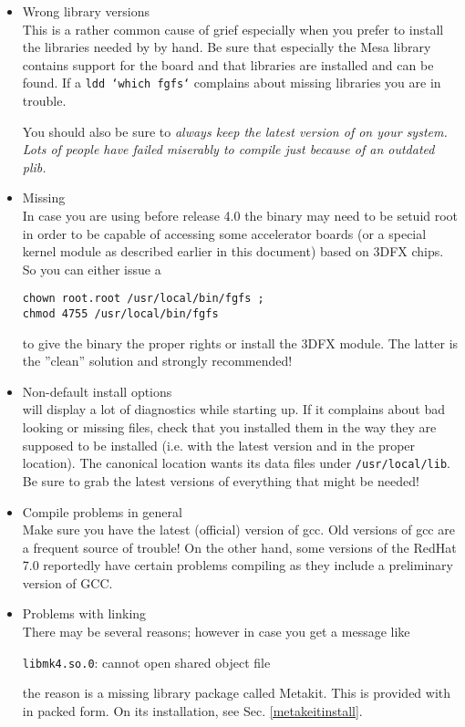 \begin{itemize}

\item{Wrong library versions}\\
  This is a rather common cause of grief especially when you prefer to
  install the libraries needed by \FlightGear{} by hand. Be sure that
  especially the Mesa library contains support for the
   board and that  libraries are installed and can be
  found. If a \texttt{ldd `which fgfs`} complains about missing
  libraries you are in trouble.

  You should also be sure to \em{always} keep the \em{latest} version
  of \PLIB{} on your system. Lots of people have
  failed miserably to compile \FlightGear{} just because of an outdated
  plib.


\item{Missing }\\
 In case you are using  before release 4.0 the \FlightGear{} binary may need to be  setuid root in order to be capable of  accessing some accelerator boards (or a special kernel module as described earlier in this document) based on 3DFX chips.
  So you can either issue a

  \texttt{chown root.root /usr/local/bin/fgfs ;}\\
  \texttt{chmod 4755 /usr/local/bin/fgfs}

  to give the \FlightGear{} binary the proper rights or install
  the 3DFX module. The latter is the ''clean''
  solution and strongly recommended!


\item{Non-default install options}\\
  \FlightGear{} will display a lot of diagnostics while starting up.
  If it complains about bad looking or missing files, check that you
  installed them in the way they are supposed to be installed (i.e. with the latest
  version and in the proper location). The canonical location \FlightGear{}
  wants its data files under \texttt{/usr/local/lib}.
   Be sure to grab the latest versions of everything that might be needed!

\item{Compile problems in general}\\
  Make sure you have the latest (official) version of gcc. Old versions of
  gcc are a frequent source of trouble! On the other hand, some versions
  of the RedHat 7.0 reportedly have certain problems compiling \FlightGear{} as they include
  a preliminary version of GCC.

\item{Problems with linking}\\
There may be several reasons; however in case you get a message like

\texttt{libmk4.so.0}: cannot open shared object file

the reason is a missing library package called Metakit. This is provided with \SimGear{} in packed form. On its installation, see Sec. \ref{metakeitinstall}.
 \end{itemize}

